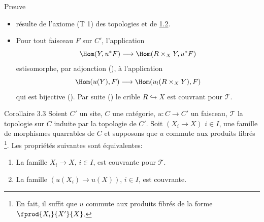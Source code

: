 \begin{enonce*}[remark]{Preuve}
\begin{itemize} %
\item[i) $\Rightarrow$ ii):] résulte de l'axiome (T 1) des topologies
  et de \hyperref[III.prop1.2]{1.2}.

\item[ii) $\Rightarrow$ i):] Pour tout faisceau $F$ sur $C'$,
  l'application
$$
\Hom(Y,u^{\ast}F)\longrightarrow \Hom(R\times_X Y, u^{\ast}F)
$$
est\pageoriginale isomorphe, par adjonction (), à
l'application
$$
\Hom(u(Y),F)\longrightarrow \Hom(u_{!}(R\times_X Y),F)
$$
qui est bijective (). Par suite ()
le crible $R\hookrightarrow X$ est couvrant pour $𝒯$.
\end{itemize}
\end{enonce*}

\begin{enonce*}{Corollaire 3.3}
Soient $C'$ un site, $C$ une catégorie, $u:C\rightarrow C'$ un
faisceau, $𝒯$ la topologie sur $C$ induite par la topologie de
$C'$. Soit $(X_i\rightarrow X)$ $i\in I$, une famille de morphismes
quarrables de $C$ et supposons que $u$ commute aux produits fibrés
\footnote[2]{En fait, il suffit que $u$ commute aux produits fibrés
  de la forme $\fprod{X_i}{X'}{X}$.}. Les propriétés suivantes
sont équivalentes:
\begin{enumerate}
\renewcommand{\theenumi}{\roman{enumi}}
\renewcommand{\labelenumi}{\theenumi)}
\item La famille $X_i\rightarrow X$, $i\in I$, est couvrante pour
  $𝒯$.

\item La famille $(u(X_i)\rightarrow u(X))$, $i\in I$, est couvrante.
\end{enumerate}
\end{enonce*}

